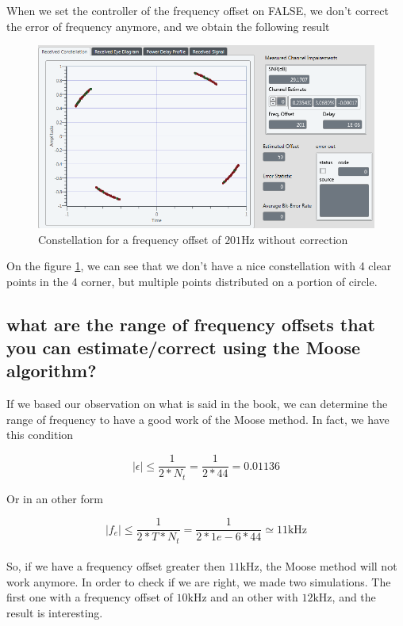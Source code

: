 \documentclass[frenchb, oneside, headings=normal]{scrartcl}
\begin{document}
When we set the controller of the frequency offset on FALSE, we don't correct the error of frequency anymore, and we obtain the following result

\begin{figure}[!ht]
\centering
\includegraphics[scale=0.7]{img/test_offset_201hz_OFF.PNG}
\caption{Constellation for a frequency offset of $201 \si{\hertz}$ without correction}
\label{freq_correct_off}
\end{figure}

On the figure \ref{freq_correct_off}, we can see  that we don't have a nice constellation with 4 clear points in the 4 corner, but multiple points distributed on a portion of circle.

\subsection{what are the range of frequency offsets that you can estimate/correct using the Moose algorithm?}

If we based our observation on what is said in the book, we can determine the range of frequency to have a good work of the Moose method. In fact, we have this condition

\begin{equation}
|\epsilon| \leq \frac{1}{2*N_t} = \frac{1}{2*44} = 0.01136
\label{cdt1}
\end{equation}

Or in an other form 

\begin{equation}
|f_e| \leq \frac{1}{2*T*N_t} = \frac{1}{2*1e-6*44} \simeq 11 \si{\kilo\hertz}
\label{cdt2}
\end{equation}\\

So, if we have a frequency offset greater then $11 \si{\kilo\hertz}$, the Moose method will not work anymore. In order to check if we are right, we made two simulations. The first one with a frequency offset of $10 \si{\kilo\hertz}$ and an other with $12 \si{\kilo\hertz}$, and the result is interesting.\\
\end{document}

